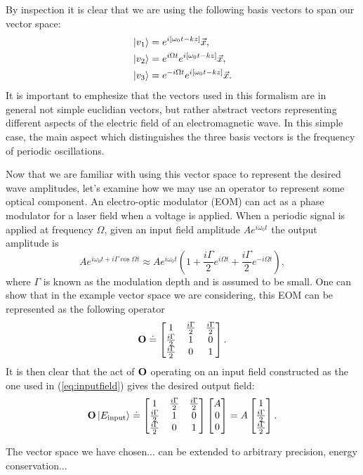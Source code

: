 By inspection it is clear that we are using the following basis vectors to span our vector space:
\begin{align}
\left| v_1 \right>&=e^{i[\omega_0 t-kz]}\vec{x}\notag, \\
\left| v_2 \right>&=e^{i\Omega t}e^{i[\omega_0 t-kz]}\vec{x}, \\
\left| v_3 \right>&=e^{-i\Omega t}e^{i[\omega_0 t-kz]}\vec{x}\notag.
\end{align}
It is important to emphesize that the vectors used in this formalism are in general not simple euclidian vectors, but rather abstract vectors representing different aspects of the electric field of an electromagnetic wave. %
In this simple case, the main aspect which distinguishes the three basis vectors is the frequency of periodic oscillations. %


Now that we are familiar with using this vector space to represent the desired wave amplitudes, let's examine how we may use an operator to represent some optical component. %
An electro-optic modulator (EOM) can act as a phase modulator for a laser field when a voltage is applied. %
When a periodic signal is applied at frequency $\Omega$, given an input field amplitude $Ae^{i\omega_0 t}$ the output amplitude is
\newcommand{\gammahalf}{\frac{i\Gamma}{2}}
\begin{equation}
\label{eq:inputfield}
Ae^{i\omega_0 t + i\Gamma \cos{\Omega t}}\approx Ae^{i\omega_0 t}\left(1+\gammahalf e^{i\Omega t}+\gammahalf e^{-i\Omega t}\right),
\end{equation}
where $\Gamma$ is known as the modulation depth and is assumed to be small. %
One can show that in the example vector space we are considering, this EOM can be represented as the following operator
\begin{equation}
\oper{O} \doteq 
\ms 
1          & \gammahalf & \gammahalf \\
\gammahalf & 1          & 0          \\
\gammahalf & 0          & 1 \\
\me.
\end{equation}
It is then clear that the act of $\mathbf{O}$ operating on an input field constructed as the one used in (\ref{eq:inputfield}) gives the desired output field:
\begin{equation}
\oper{O}\vect{E_{\text{input}}} \doteq \ms 
1          & \gammahalf & \gammahalf \\
\gammahalf & 1          & 0          \\
\gammahalf & 0          & 1 \\
\me
\ms A \\ 0 \\ 0 \me = A \ms  1 \\ \gammahalf \\ \gammahalf \me.
\end{equation}

The vector space we have chosen... %
can be extended to arbitrary precision, energy conservation...